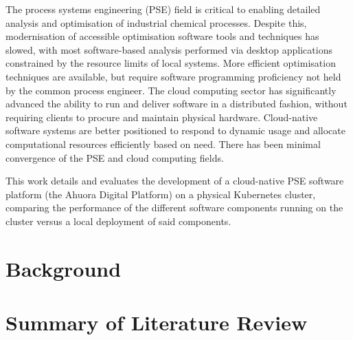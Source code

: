 The process systems engineering (PSE) field is critical to enabling detailed analysis and optimisation of industrial chemical processes. Despite this, modernisation of accessible optimisation software tools and techniques has slowed, with most software-based analysis performed via desktop applications constrained by the resource limits of local systems. More efficient optimisation techniques are available, but require software programming proficiency not held by the common process engineer. The cloud computing sector has significantly advanced the ability to run and deliver software in a distributed fashion, without requiring clients to procure and maintain physical hardware. Cloud-native software systems are better positioned to respond to dynamic usage and allocate computational resources efficiently based on need. There has been minimal convergence of the PSE and cloud computing fields.

This work details and evaluates the development of a cloud-native PSE software platform (the Ahuora Digital Platform) on a physical Kubernetes cluster, comparing the performance of the different software components running on the cluster versus a local deployment of said components.

\section{Background}

\section{Summary of Literature Review}